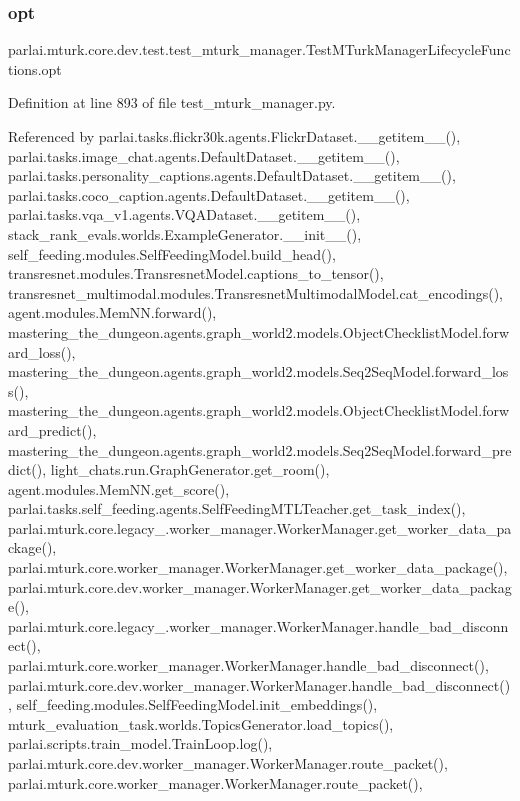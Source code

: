 \subsubsection{\texorpdfstring{opt}{opt}}
{\footnotesize\ttfamily parlai.\+mturk.\+core.\+dev.\+test.\+test\+\_\+mturk\+\_\+manager.\+Test\+M\+Turk\+Manager\+Lifecycle\+Functions.\+opt}



Definition at line 893 of file test\+\_\+mturk\+\_\+manager.\+py.



Referenced by parlai.\+tasks.\+flickr30k.\+agents.\+Flickr\+Dataset.\+\_\+\+\_\+getitem\+\_\+\+\_\+(), parlai.\+tasks.\+image\+\_\+chat.\+agents.\+Default\+Dataset.\+\_\+\+\_\+getitem\+\_\+\+\_\+(), parlai.\+tasks.\+personality\+\_\+captions.\+agents.\+Default\+Dataset.\+\_\+\+\_\+getitem\+\_\+\+\_\+(), parlai.\+tasks.\+coco\+\_\+caption.\+agents.\+Default\+Dataset.\+\_\+\+\_\+getitem\+\_\+\+\_\+(), parlai.\+tasks.\+vqa\+\_\+v1.\+agents.\+V\+Q\+A\+Dataset.\+\_\+\+\_\+getitem\+\_\+\+\_\+(), stack\+\_\+rank\+\_\+evals.\+worlds.\+Example\+Generator.\+\_\+\+\_\+init\+\_\+\+\_\+(), self\+\_\+feeding.\+modules.\+Self\+Feeding\+Model.\+build\+\_\+head(), transresnet.\+modules.\+Transresnet\+Model.\+captions\+\_\+to\+\_\+tensor(), transresnet\+\_\+multimodal.\+modules.\+Transresnet\+Multimodal\+Model.\+cat\+\_\+encodings(), agent.\+modules.\+Mem\+N\+N.\+forward(), mastering\+\_\+the\+\_\+dungeon.\+agents.\+graph\+\_\+world2.\+models.\+Object\+Checklist\+Model.\+forward\+\_\+loss(), mastering\+\_\+the\+\_\+dungeon.\+agents.\+graph\+\_\+world2.\+models.\+Seq2\+Seq\+Model.\+forward\+\_\+loss(), mastering\+\_\+the\+\_\+dungeon.\+agents.\+graph\+\_\+world2.\+models.\+Object\+Checklist\+Model.\+forward\+\_\+predict(), mastering\+\_\+the\+\_\+dungeon.\+agents.\+graph\+\_\+world2.\+models.\+Seq2\+Seq\+Model.\+forward\+\_\+predict(), light\+\_\+chats.\+run.\+Graph\+Generator.\+get\+\_\+room(), agent.\+modules.\+Mem\+N\+N.\+get\+\_\+score(), parlai.\+tasks.\+self\+\_\+feeding.\+agents.\+Self\+Feeding\+M\+T\+L\+Teacher.\+get\+\_\+task\+\_\+index(), parlai.\+mturk.\+core.\+legacy\+\_.\+worker\+\_\+manager.\+Worker\+Manager.\+get\+\_\+worker\+\_\+data\+\_\+package(), parlai.\+mturk.\+core.\+worker\+\_\+manager.\+Worker\+Manager.\+get\+\_\+worker\+\_\+data\+\_\+package(), parlai.\+mturk.\+core.\+dev.\+worker\+\_\+manager.\+Worker\+Manager.\+get\+\_\+worker\+\_\+data\+\_\+package(), parlai.\+mturk.\+core.\+legacy\+\_.\+worker\+\_\+manager.\+Worker\+Manager.\+handle\+\_\+bad\+\_\+disconnect(), parlai.\+mturk.\+core.\+worker\+\_\+manager.\+Worker\+Manager.\+handle\+\_\+bad\+\_\+disconnect(), parlai.\+mturk.\+core.\+dev.\+worker\+\_\+manager.\+Worker\+Manager.\+handle\+\_\+bad\+\_\+disconnect(), self\+\_\+feeding.\+modules.\+Self\+Feeding\+Model.\+init\+\_\+embeddings(), mturk\+\_\+evaluation\+\_\+task.\+worlds.\+Topics\+Generator.\+load\+\_\+topics(), parlai.\+scripts.\+train\+\_\+model.\+Train\+Loop.\+log(), parlai.\+mturk.\+core.\+dev.\+worker\+\_\+manager.\+Worker\+Manager.\+route\+\_\+packet(), parlai.\+mturk.\+core.\+worker\+\_\+manager.\+Worker\+Manager.\+route\+\_\+packet(), 